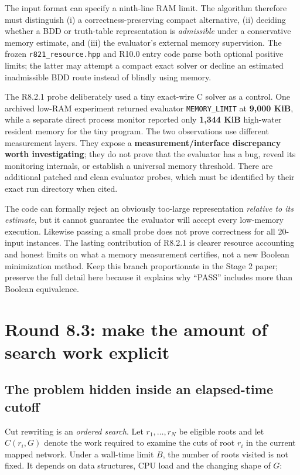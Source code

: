 The input format can specify a ninth-line RAM limit. The algorithm therefore must distinguish (i) a correctness-preserving compact alternative, (ii) deciding whether a BDD or truth-table representation is \emph{admissible} under a conservative memory estimate, and (iii) the evaluator's external memory supervision. The frozen \texttt{r821\_resource.hpp} and R10.0 entry code parse both optional positive limits; the latter may attempt a compact exact solver or decline an estimated inadmissible BDD route instead of blindly using memory.

The R8.2.1 probe deliberately used a tiny exact-wire C solver as a control. One archived low-RAM experiment returned evaluator \texttt{MEMORY\_LIMIT} at \textbf{9,000 KiB}, while a separate direct process monitor reported only \textbf{1,344 KiB} high-water resident memory for the tiny program. The two observations use different measurement layers. They expose a \textbf{measurement/interface discrepancy worth investigating}; they do not prove that the evaluator has a bug, reveal its monitoring internals, or establish a universal memory threshold. There are additional patched and clean evaluator probes, which must be identified by their exact run directory when cited.

The code can formally reject an obviously too-large representation \emph{relative to its estimate}, but it cannot guarantee the evaluator will accept every low-memory execution. Likewise passing a small probe does not prove correctness for all 20-input instances. The lasting contribution of R8.2.1 is clearer resource accounting and honest limits on what a memory measurement certifies, not a new Boolean minimization method. Keep this branch proportionate in the Stage 2 paper; preserve the full detail here because it explains why ``PASS'' includes more than Boolean equivalence.

\section{Round 8.3: make the amount of search work explicit}\label{round-8.3-make-the-amount-of-search-work-explicit}

\subsection{The problem hidden inside an elapsed-time cutoff}\label{the-problem-hidden-inside-an-elapsed-time-cutoff}

Cut rewriting is an \emph{ordered search}. Let \(r_1,\ldots,r_N\) be eligible roots and let \(C(r_i,G)\) denote the work required to examine the cuts of root \(r_i\) in the current mapped network. Under a wall-time limit \(B\), the number of roots visited is not fixed. It depends on data structures, CPU load and the changing shape of \(G\):

